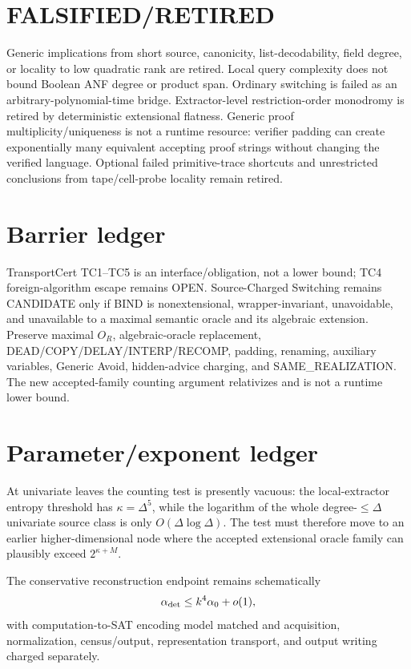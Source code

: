 \documentclass[11pt]{article}
\begin{document}
\section*{FALSIFIED/RETIRED}
Generic implications from short source, canonicity, list-decodability, field degree, or locality to low quadratic rank are retired. Local query complexity does not bound Boolean ANF degree or product span. Ordinary switching is failed as an arbitrary-polynomial-time bridge. Extractor-level restriction-order monodromy is retired by deterministic extensional flatness. Generic proof multiplicity/uniqueness is not a runtime resource: verifier padding can create exponentially many equivalent accepting proof strings without changing the verified language. Optional failed primitive-trace shortcuts and unrestricted conclusions from tape/cell-probe locality remain retired.

\section*{Barrier ledger}
TransportCert TC1--TC5 is an interface/obligation, not a lower bound; TC4 foreign-algorithm escape remains OPEN. Source-Charged Switching remains CANDIDATE only if BIND is nonextensional, wrapper-invariant, unavoidable, and unavailable to a maximal semantic oracle and its algebraic extension. Preserve maximal $O_R$, algebraic-oracle replacement, DEAD/COPY/DELAY/INTERP/RECOMP, padding, renaming, auxiliary variables, Generic Avoid, hidden-advice charging, and SAME_REALIZATION. The new accepted-family counting argument relativizes and is not a runtime lower bound.

\section*{Parameter/exponent ledger}
At univariate leaves the counting test is presently vacuous: the local-extractor entropy threshold has $\kappa=\Delta^5$, while the logarithm of the whole degree-$\le\Delta$ univariate source class is only $O(\Delta\log\Delta)$. The test must therefore move to an earlier higher-dimensional node where the accepted extensional oracle family can plausibly exceed $2^{\kappa+M}$.

The conservative reconstruction endpoint remains schematically
\[
\alpha_{\rm det}\le k^4\alpha_0+o(1),
\]
with computation-to-SAT encoding model matched and acquisition, normalization, census/output, representation transport, and output writing charged separately.
\end{document}
